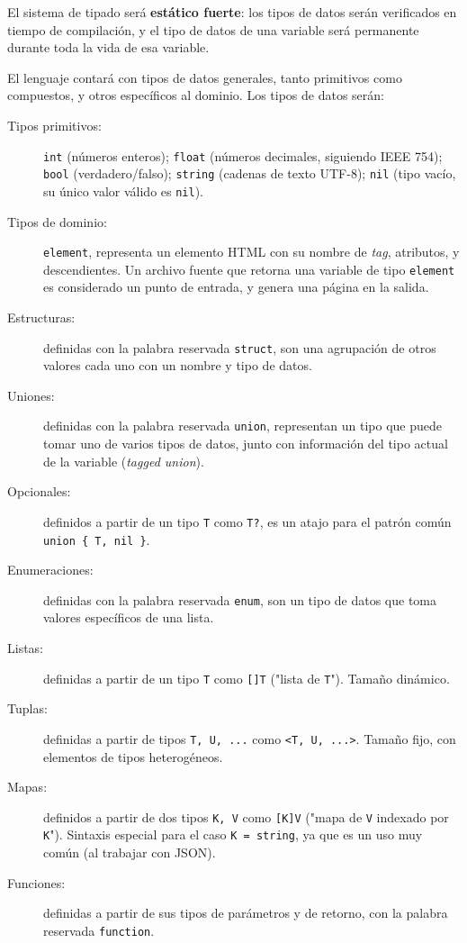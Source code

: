 El sistema de tipado será \textbf{estático fuerte}: los tipos de datos serán
verificados en tiempo de compilación, y el tipo de datos de una variable será
permanente durante toda la vida de esa variable.

El lenguaje contará con tipos de datos generales, tanto primitivos como
compuestos, y otros específicos al dominio. Los tipos de datos serán:

\begin{description}
	\item[Tipos primitivos:] \texttt{int} (números enteros); \texttt{float}
  	(números decimales, siguiendo IEEE 754); \texttt{bool} (verdadero/falso);
    \texttt{string} (cadenas de texto UTF-8); \texttt{nil} (tipo vacío, su único
    valor válido es \texttt{nil}).
  \item[Tipos de dominio:] \texttt{element}, representa un elemento HTML con su
    nombre de \textit{tag}, atributos, y descendientes. Un archivo fuente que
    retorna una variable de tipo \texttt{element} es considerado un punto de
    entrada, y genera una página en la salida.
  \item[Estructuras:] definidas con la palabra reservada \texttt{struct}, son
    una agrupación de otros valores cada uno con un nombre y tipo de datos.
  \item[Uniones:] definidas con la palabra reservada \texttt{union}, representan
    un tipo que puede tomar uno de varios tipos de datos, junto con información
    del tipo actual de la variable (\textit{tagged union}).
  \item[Opcionales:] definidos a partir de un tipo \texttt{T} como \texttt{T?},
    es un atajo para el patrón común \texttt{union \{ T, nil \}}.
  \item[Enumeraciones:] definidas con la palabra reservada \texttt{enum}, son un
    tipo de datos que toma valores específicos de una lista.
  \item[Listas:] definidas a partir de un tipo \texttt{T} como \texttt{[]T}
    ("lista de \texttt{T}"). Tamaño dinámico.
  \item[Tuplas:] definidas a partir de tipos \texttt{T, U, ...} como
    \texttt{<T, U, ...>}. Tamaño fijo, con elementos de tipos heterogéneos.
  \item[Mapas:] definidos a partir de dos tipos \texttt{K, V} como \texttt{[K]V}
    ("mapa de \texttt{V} indexado por \texttt{K}"). Sintaxis especial para el
    caso \texttt{K = string}, ya que es un uso muy común (al trabajar con JSON).
  \item[Funciones:] definidas a partir de sus tipos de parámetros y de retorno,
    con la palabra reservada \texttt{function}.
\end{description}

